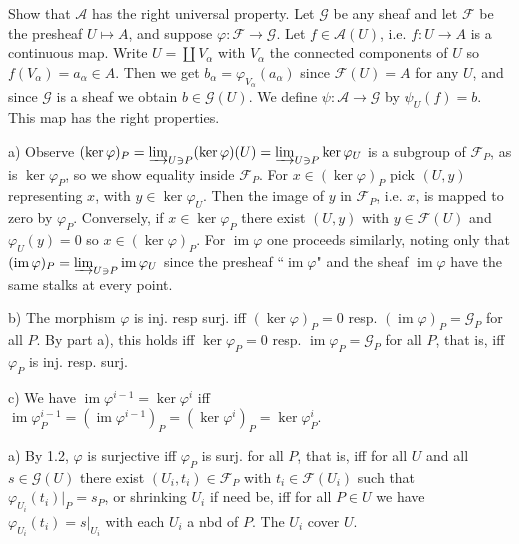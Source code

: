 \documentclass{report}
\DeclareMathOperator{\im}{im}
\newcommand{\F}{\mathcal{F}}
\newcommand{\G}{\mathcal{G}}
\begin{document}
\chapter{}

\section{}

	Show that $\mathcal{A}$ has the right universal property.
Let $\G$ be any sheaf and let $\F$ be the
presheaf $U\mapsto A$, and suppose $\varphi:\F\rightarrow\G$.  Let $f\in \mathcal{A}(U)$,
i.e. $f:U\rightarrow A$ is a continuous map.  Write $U=\coprod V_{\alpha}$  with $V_{\alpha}$
the connected components of $U$ so $f(V_{\alpha})=a_{\alpha}\in A$.  Then we get $b_{\alpha}=\varphi_{V_{\alpha}}(a_{\alpha})$
since $\F(U)=A$ for any $U$, and since $\G$ is a sheaf we obtain $b\in\G(U)$.  We define
$\psi:\mathcal{A}\rightarrow\G$ by $\psi_U(f)=b$.  This map has the right properties.

\bigskip
{}	a) Observe $(\ker \varphi)_P=\varinjlim_{U\ni P} (\ker\varphi)(U)=\varinjlim_{U\ni P} \ker\varphi_U$
is a subgroup of $\F_P$, as is $\ker \varphi_P$, so we show equality inside $\F_P$.
For $x\in (\ker\varphi)_P$ pick $(U,y)$ representing $x$, with $y\in\ker\varphi_U$.  Then the image of $y$
in $\F_P$, i.e. $x$, is mapped to zero by $\varphi_P$.  Conversely, if $x\in\ker\varphi_P$
there exist $(U,y)$ with $y\in \F(U)$ and $\varphi_U(y)=0$ so $x\in (\ker\varphi)_P$.
For $\im\varphi$ one proceeds similarly, noting only that $(\im\varphi)_P=\varinjlim_{U\ni P} \im\varphi_U$ since
the presheaf ``$\im\varphi$" and the sheaf $\im\varphi$ have the same stalks at every point.

\noindent
b)	The morphism $\varphi$ is inj. resp surj. iff $(\ker\varphi)_P=0$ resp. $(\im\varphi)_P=\G_P$ for all $P$.
By part a), this holds iff $\ker\varphi_P=0$ resp. $\im\varphi_P=\G_P$ for all $P$, that is, iff
$\varphi_P$ is inj. resp. surj.

\noindent
c)  We have $\im\varphi^{i-1}=\ker\varphi^{i}$ iff 
$\im\varphi^{i-1}_P=(\im\varphi^{i-1})_P=(\ker\varphi^{i})_P=\ker\varphi^i_P$.

\bigskip
{}	a)  By 1.2, $\varphi$ is surjective iff $\varphi_P$ is surj. for all $P$, that is, iff for all $U$
and all $s\in\G(U)$ there exist $(U_i,t_i)\in \F_P$ with $t_i\in\F(U_i)$
such that $\varphi_{U_i}(t_i)\big|_{P}=s_P$, or shrinking $U_i$ if need be, iff for all $P\in U$
we have $\varphi_{U_i}(t_i)=s\big|_{U_i}$ with each $U_i$ a nbd of $P$.  The $U_i$ cover $U$.
\end{document}
